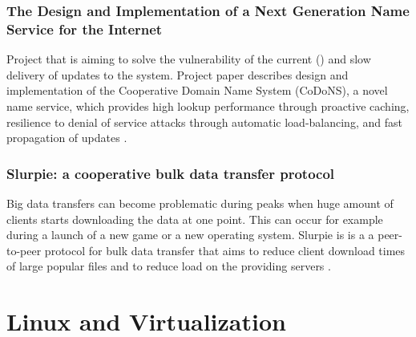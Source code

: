 \subsection{The Design and Implementation of a Next Generation Name Service for the Internet}
Project that is aiming to solve the vulnerability of the current  () and slow delivery of updates to the system. Project paper describes design and implementation of the Cooperative Domain Name System (CoDoNS), a novel name service, which provides high lookup performance through proactive caching, resilience to denial of service attacks through automatic load-balancing, and fast propagation of updates \cite{Ramasubramanian:2004:DIN:1030194.1015504}.
\subsection{Slurpie: a cooperative bulk data transfer protocol}
Big data transfers can become problematic during peaks when huge amount of clients starts downloading the data at one point. This can occur for example during a launch of a new game or a new operating system. Slurpie is is a  a peer-to-peer protocol for bulk data transfer that aims to reduce client download times of large popular files and to reduce load on the providing servers \cite{1356981}. 
\chapter{Linux and Virtualization}
\label{chapter:Linux}
